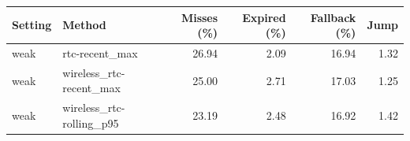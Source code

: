 \begin{tabular}{llrrrr}
\toprule
Setting & Method & Misses (\%) & Expired (\%) & Fallback (\%) & Jump \\
\midrule
weak & rtc-recent\_max & 26.94 & 2.09 & 16.94 & 1.32 \\
weak & wireless\_rtc-recent\_max & 25.00 & 2.71 & 17.03 & 1.25 \\
weak & wireless\_rtc-rolling\_p95 & 23.19 & 2.48 & 16.92 & 1.42 \\
\bottomrule
\end{tabular}
